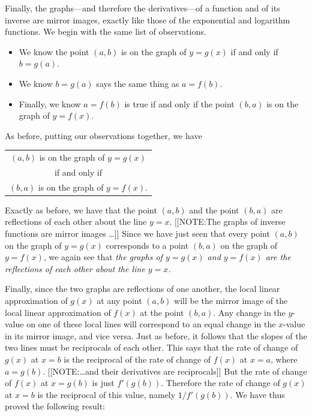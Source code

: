 	Finally, the graphs---and therefore the derivatives---of a function and of its inverse are mirror images, exactly like those of the exponential and logarithm functions.  We begin with the same list of observations.
\begin{itemize}
\item  We know the point $(a, b)$ is on the graph of $y=g(x)$ if and only if
  $b = g(a)$.
\item  We know $b = g(a)$ says the same thing as $a = f(b)$.
\item  Finally, we know $a = f(b)$ is true if and only if the point $(b, a)$ is on the graph of $y = f(x)$.
\end{itemize}


As before, putting our observations together, we have
\begin{center}


\begin{tabular}{c}
$(a, b)$ is on the graph of $y=g(x)$ \\
if and only if \\
$(b, a)$ is on the graph of $y=f(x)$.
\end{tabular}

\end{center}

\noindent Exactly as before, we have that the point $(a, b)$ and the point $(b, a)$ are reflections of each other about the line $y=x$.  
	[[NOTE:The graphs of inverse functions are mirror images \ldots]]
Since we have just seen that every point  $(a, b)$ on the graph of $y=g(x)$ corresponds to a point $(b, a)$ on the graph of $y=f(x)$, we again see that {\em the 
graphs of $y=g(x)$ and $y=f(x)$ are the reflections of each other     about the line $y=x$.}


	Finally, since the two graphs are reflections of one another, the local linear 
approximation of $g(x)$  at any point $(a, b)$ will be the mirror image of 
the local linear approximation of $f(x)$ at the point $(b, a)$. 
Any change in the $y$-value on one of these local lines will correspond to an equal change 
in the $x$-value in its mirror image, and vice versa.  
Just as before, it follows that the slopes of the two lines must be reciprocals of each other.  This says that the rate of change of $g(x)$ at $x = b$ is the reciprocal of 
the rate of change of $f(x)$ at $x = a$, where $a = g(b)$.  
	[[NOTE:\ldots and their derivatives are reciprocals]]
But the rate of change of $f(x)$ at $x = g(b)$ is just $f'(g(b))$.  Therefore the rate of change of $g(x)$ at $x = b$ is the reciprocal of this value, namely $1/f'(g(b))$.  We have thus proved the 
following result:  



